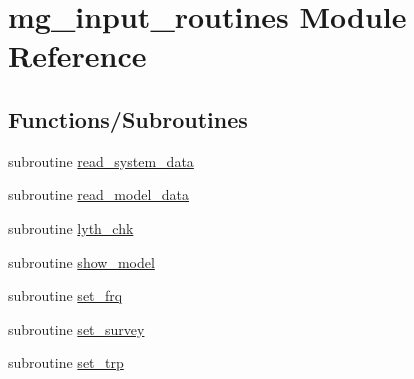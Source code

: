 \hypertarget{namespacemg__input__routines}{}\section{mg\+\_\+input\+\_\+routines Module Reference}
\label{namespacemg__input__routines}
\subsection*{Functions/\+Subroutines}
\begin{DoxyCompactItemize}
\item 
subroutine \hyperlink{namespacemg__input__routines_a77a7419ce373edc9895839fc0d469d78}{read\+\_\+system\+\_\+data}
\item 
subroutine \hyperlink{namespacemg__input__routines_acd1da063201ad2300b429047265d6c91}{read\+\_\+model\+\_\+data}
\item 
subroutine \hyperlink{namespacemg__input__routines_a9e1339657e87110a735f9631657c9019}{lyth\+\_\+chk}
\item 
subroutine \hyperlink{namespacemg__input__routines_a01c4f84680a9bc565592f441959beccc}{show\+\_\+model}
\item 
subroutine \hyperlink{namespacemg__input__routines_ac8682ae293c93e95b72b4b7c222f9ed4}{set\+\_\+frq}
\item 
subroutine \hyperlink{namespacemg__input__routines_af6f593fecea83164d8d0352ef801c23b}{set\+\_\+survey}
\item 
subroutine \hyperlink{namespacemg__input__routines_a1b72deaf9809d0b370c1a68cd01e9d32}{set\+\_\+trp}
\end{DoxyCompactItemize}
